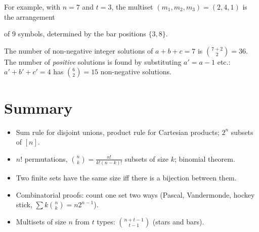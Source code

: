 For example, with $n = 7$ and $t = 3$, the multiset $(m_1,m_2,m_3) = (2,4,1)$ is the
arrangement
\begin{center}
\end{center}
of $9$ symbols, determined by the bar positions $\{3,8\}$.

\begin{example}
The number of non-negative integer solutions of $a+b+c = 7$ is $\binom{7+2}{2} = 36$. The
number of \emph{positive} solutions is found by substituting $a' = a-1$ etc.:
$a'+b'+c' = 4$ has $\binom{6}{2} = 15$ non-negative solutions.
\end{example}

\section{Summary}
\begin{itemize}
  \item Sum rule for disjoint unions, product rule for Cartesian products; $2^n$ subsets of $[n]$.
  \item $n!$ permutations, $\binom{n}{k} = \frac{n!}{k!(n-k)!}$ subsets of size $k$; binomial theorem.
  \item Two finite sets have the same size iff there is a bijection between them.
  \item Combinatorial proofs: count one set two ways (Pascal, Vandermonde, hockey stick,
        $\sum k\binom{n}{k} = n2^{n-1}$).
  \item Multisets of size $n$ from $t$ types: $\binom{n+t-1}{t-1}$ (stars and bars).
\end{itemize}

